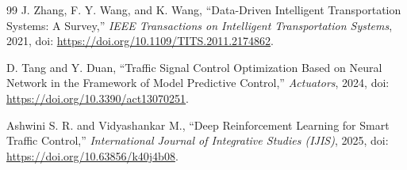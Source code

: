 \begin{thebibliography}{99}
J. Zhang, F. Y. Wang, and K. Wang, ``Data-Driven Intelligent Transportation Systems: A Survey,'' \textit{IEEE Transactions on Intelligent Transportation Systems}, 2021, doi: \url{https://doi.org/10.1109/TITS.2011.2174862}.

D. Tang and Y. Duan, ``Traffic Signal Control Optimization Based on Neural Network in the Framework of Model Predictive Control,'' \textit{Actuators}, 2024, doi: \url{https://doi.org/10.3390/act13070251}.

Ashwini S. R. and Vidyashankar M., ``Deep Reinforcement Learning for Smart Traffic Control,'' \textit{International Journal of Integrative Studies (IJIS)}, 2025, doi: \url{https://doi.org/10.63856/k40j4b08}.

\end{thebibliography}
